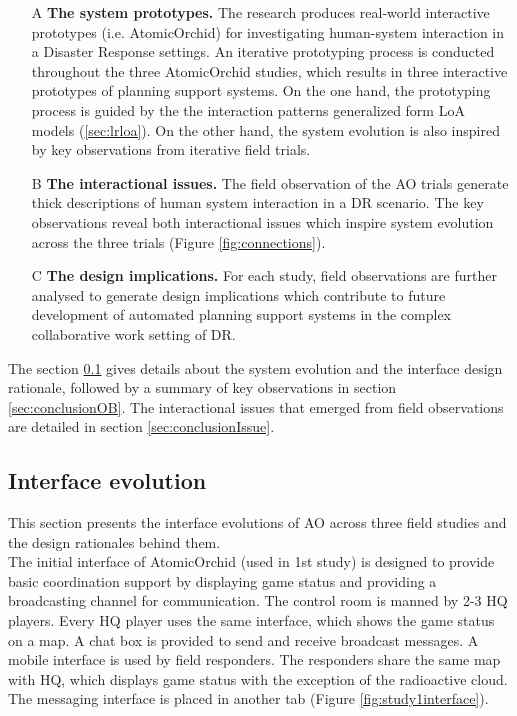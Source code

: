 \begin{enumerate}
  \item[A] \textbf{The system prototypes.} The research produces real-world interactive prototypes (i.e. AtomicOrchid) for investigating human-system interaction in a Disaster Response settings. An iterative prototyping process is conducted throughout the three AtomicOrchid studies, which results in three interactive prototypes of planning support systems. On the one hand, the prototyping process is guided by the the interaction patterns generalized form \ac{LoA} models (\ref{sec:lrloa}). On the other hand, the system evolution is also inspired by key observations from iterative field trials. 
  
  \item[B] \textbf{The interactional issues.} The field observation of the \ac{AO} trials generate thick descriptions of human system interaction in a \ac{DR} scenario. The key observations reveal both interactional issues which inspire system evolution across the three trials (Figure \ref{fig:connections}).
  
  \item[C] \textbf{The design implications.} For each study, field observations are further analysed to generate design implications which contribute to future development of automated planning support systems in the complex collaborative work setting of \ac{DR}. 
\end{enumerate}

The section \ref{sec:conclusionIE} gives details about the system evolution and the interface design rationale, followed by a summary of key observations in section \ref{sec:conclusionOB}. The interactional issues that emerged from field observations are detailed in section \ref{sec:conclusionIssue}. \\



\subsection{Interface evolution}\label{sec:conclusionIE}
This section presents the interface evolutions of \acf{AO} across three field studies and the design rationales behind them.\\

The initial interface of AtomicOrchid (used in 1st study) is designed to provide basic coordination support by displaying game status and providing a broadcasting channel for communication. The control room is manned by 2-3 HQ players. Every HQ player uses the same interface, which shows the game status on a map. A chat box is provided to send and receive broadcast messages. A mobile interface is used by field responders. The responders share the same map with HQ, which displays game status with the exception of the radioactive cloud. The messaging interface is placed in another tab (Figure \ref{fig:study1interface}).\\ 

